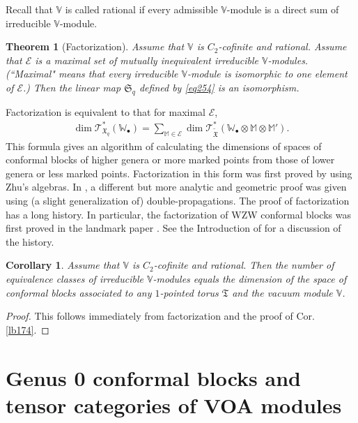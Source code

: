 \documentclass[12pt,a4paper,notitlepage]{article}
\theoremstyle{definition}
\theoremstyle{plain}
\newtheorem{thm}[df]{Theorem}
\newtheorem{co}[df]{Corollary}
\newcommand{\fk}{\mathfrak}
\newcommand{\mc}{\mathcal}
\newcommand{\wtd}{\widetilde}
\newcommand{\scr}{\mathscr}
\newcommand{\blt}{\bullet}
\newcommand{\Vbb}{\mathbb V}
\newcommand{\Wbb}{\mathbb W}
\newcommand{\Mbb}{\mathbb M}
\numberwithin{equation}{section}
\begin{document}
Recall that $\Vbb$ is called rational if every admissible $\Vbb$-module is a direct sum of irreducible $\Vbb$-module.

\begin{thm}[Factorization]\label{lb181}
Assume that $\Vbb$ is $C_2$-cofinite and rational. Assume that $\mc E$ is a maximal set of mutually inequivalent irreducible $\Vbb$-modules. (``Maximal" means that every irreducible $\Vbb$-module is isomorphic to one element of $\mc E$.) Then the linear map $\fk S_q$ defined by \eqref{eq254} is an isomorphism.
\end{thm}


Factorization is equivalent to that for maximal $\mc E$,
\begin{align}
\dim\scr T_{\fk X_q}^*(\Wbb_\blt)=\sum_{\Mbb\in\mc E}\dim\scr T_{\wtd{\fk X}}^*(\Wbb_\blt\otimes\Mbb\otimes\Mbb').
\end{align}
This formula gives an algorithm of calculating the dimensions of spaces of conformal blocks of higher genera or more marked points from those of lower genera or less marked points. Factorization in this form was first proved by \cite{DGT19} using Zhu's algebras. In \cite[Sec. 4.6, 4.7]{Gui}, a different but more analytic and geometric proof was given using (a slight generalization of) double-propagations. The proof of factorization has a long history. In particular, the factorization of WZW conformal blocks was first proved in the landmark paper \cite{TUY89}. See the Introduction of \cite{DGT19} for a discussion of the history.



\begin{co}
Assume that $\Vbb$ is $C_2$-cofinite and rational. Then the number of equivalence classes of irreducible $\Vbb$-modules equals the dimension of the space of conformal blocks associated to any $1$-pointed torus $\fk T$ and the vacuum module $\Vbb$. 
\end{co}
\begin{proof}
This follows immediately from factorization and the proof of Cor. \ref{lb174}.
\end{proof}



\section{Genus 0 conformal blocks and tensor categories of VOA modules}


\subsection{}
\end{document}
